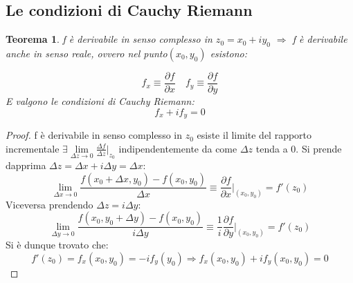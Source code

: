 \documentclass[twoside]{article}
\newtheorem{theorem}{Teorema}[section]
\begin{document}
\subsection{Le condizioni di Cauchy Riemann}
\begin{theorem}f è derivabile in senso complesso in $z_0=x_0+iy_0$ $\Longrightarrow$ f è derivabile anche in senso reale, ovvero nel punto$(x_0,y_0)$ esistono:\end{theorem}
\begin{equation}
	 f_x\equiv\frac{\partial f}{\partial x} \quad f_y\equiv\frac{\partial f}{\partial y}
\end{equation}	
\textit{E valgono le condizioni di Cauchy Riemann:}
\begin{equation} \label{CR}
	f_x+if_y=0\end{equation}	\begin{proof}
    f è derivabile in senso complesso in $z_0$ esiste il limite del rapporto incrementale $\exists \lim\limits_{\Delta z\to 0}\frac{\Delta f}{\Delta z}\biggl|_{z_0}$ indipendentemente da come $\Delta z$ tenda a 0. Si prende dapprima $\Delta z=\Delta x+i\Delta y=\Delta x$:
    \begin{equation}
        \lim_{\Delta x\to 0 }\frac{f(x_0+\Delta x,y_0)-f(x_0,y_0)}{\Delta x}\equiv \frac{\partial f}{\partial x}\biggl|_{(x_0,y_0)}=f'(z_0)
    \end{equation}
    Viceversa prendendo $\Delta z=i\Delta y$:
    \begin{equation}
        \lim_{\Delta y\to 0 }\frac{f(x_0,y_0+\Delta y)-f(x_0,y_0)}{i\Delta y}\equiv \frac{1}{i}\frac{\partial f}{\partial y}\biggl|_{(x_0,y_0)}=f'(z_0)
    \end{equation}
    Si è dunque trovato che:
    \begin{equation}
        f'(z_0)=f_x(x_0,y_0)=-if_y(y_0)\Longrightarrow f_x(x_0,y_0)+if_y(x_0,y_0)=0
    \end{equation}
\end{proof}
\end{document}
